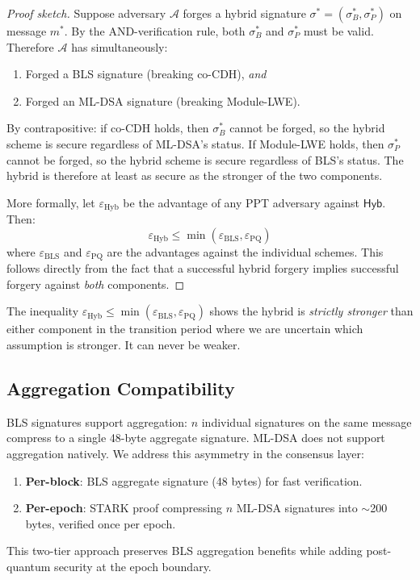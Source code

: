 \begin{proof}[Proof sketch]
Suppose adversary $\mathcal{A}$ forges a hybrid signature $\sigma^* = (\sigma_B^*,
\sigma_P^*)$ on message $m^*$. By the AND-verification rule, both $\sigma_B^*$ and
$\sigma_P^*$ must be valid. Therefore $\mathcal{A}$ has simultaneously:
\begin{enumerate}
  \item Forged a BLS signature (breaking co-CDH), \emph{and}
  \item Forged an ML-DSA signature (breaking Module-LWE).
\end{enumerate}

By contrapositive: if co-CDH holds, then $\sigma_B^*$ cannot be forged, so the
hybrid scheme is secure regardless of ML-DSA's status. If Module-LWE holds, then
$\sigma_P^*$ cannot be forged, so the hybrid scheme is secure regardless of BLS's
status. The hybrid is therefore at least as secure as the stronger of the two
components.

More formally, let $\varepsilon_{\text{Hyb}}$ be the advantage of any PPT adversary
against $\textsf{Hyb}$. Then:
\[
  \varepsilon_{\text{Hyb}} \leq \min(\varepsilon_{\text{BLS}}, \varepsilon_{\text{PQ}})
\]
where $\varepsilon_{\text{BLS}}$ and $\varepsilon_{\text{PQ}}$ are the advantages
against the individual schemes. This follows directly from the fact that a successful
hybrid forgery implies successful forgery against \emph{both} components.
\end{proof}

\begin{remark}
The inequality $\varepsilon_{\text{Hyb}} \leq \min(\varepsilon_{\text{BLS}},
\varepsilon_{\text{PQ}})$ shows the hybrid is \emph{strictly stronger} than either
component in the transition period where we are uncertain which assumption is
stronger. It can never be weaker.
\end{remark}

\subsection{Aggregation Compatibility}

BLS signatures support aggregation: $n$ individual signatures on the same message
compress to a single 48-byte aggregate signature. ML-DSA does not support aggregation
natively. We address this asymmetry in the consensus layer:

\begin{enumerate}[leftmargin=2em]
  \item \textbf{Per-block}: BLS aggregate signature (48 bytes) for fast verification.
  \item \textbf{Per-epoch}: STARK proof compressing $n$ ML-DSA signatures into
        $\sim$200 bytes, verified once per epoch.
\end{enumerate}

This two-tier approach preserves BLS aggregation benefits while adding post-quantum
security at the epoch boundary.

